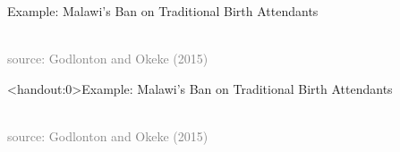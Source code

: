 \documentclass[10pt,xcolor=table,ignorenonframetext,aspectratio=169]{beamer}
\begin{document}

\begin{frame}{Example:  Malawi's Ban on Traditional Birth Attendants}

\medskip
\begin{center}
	 \\
	\textcolor{gray}{\tiny{source:  Godlonton and Okeke (2015)}}
\end{center}

\end{frame}



\begin{frame}<handout:0>{Example:  Malawi's Ban on Traditional Birth Attendants}

\medskip
\begin{center}
	 \\
	\textcolor{gray}{\tiny{source:  Godlonton and Okeke (2015)}}
\end{center}

\end{frame}


\end{document}
